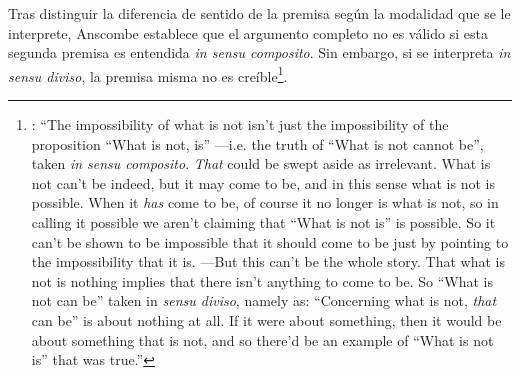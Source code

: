 Tras distinguir la diferencia de sentido de la premisa según la modalidad que se le interprete, Anscombe establece que el argumento completo no es válido si esta segunda premisa es entendida \emph{in sensu composito}. Sin embargo, si se interpreta \emph{in sensu diviso}, la premisa misma no es creíble\footnote{\cite[vii]{anscombe1981parmenides}: \enquote{The impossibility of what is not isn't just the impossibility of the proposition ``What is not, is'' ---i.e. the truth of ``What is not cannot be'', taken \emph{in sensu composito}. \emph{That} could be swept aside as irrelevant. What is not can't be indeed, but it may come to be, and in this sense what is not is possible. When it \emph{has} come to be, of course it no longer is what is not, so in calling it possible we aren't claiming that ``What is not is'' is possible. So it can't be shown to be impossible that it should come to be just by pointing to the impossibility that it is. ---But this can't be the whole story. That what is not is nothing implies that there isn't anything to come to be. So ``What is not can be'' taken in \emph{sensu diviso}, namely as: ``Concerning what is not, \emph{that} can be'' is about nothing at all. If it were about something, then it would be about something that is not, and so there'd be an example of ``What is not is'' that was true.}}.
